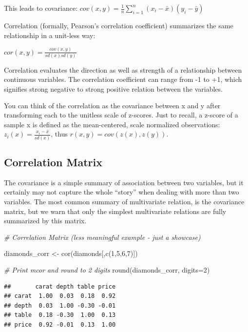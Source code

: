 \documentclass[
]{book}
\newenvironment{Shaded}{\begin{snugshade}}{\end{snugshade}}
\newcommand{\AttributeTok}[1]{\textcolor[rgb]{0.77,0.63,0.00}{#1}}
\newcommand{\CommentTok}[1]{\textcolor[rgb]{0.56,0.35,0.01}{\textit{#1}}}
\newcommand{\DecValTok}[1]{\textcolor[rgb]{0.00,0.00,0.81}{#1}}
\newcommand{\FunctionTok}[1]{\textcolor[rgb]{0.00,0.00,0.00}{#1}}
\newcommand{\NormalTok}[1]{#1}
\newcommand{\OtherTok}[1]{\textcolor[rgb]{0.56,0.35,0.01}{#1}}
\begin{document}
This leads to covariance:
\(cov(x,y) =\frac{1}{n}\sum_{i=1}^{n}(x_i - \bar{x})(y_i -\bar{y})\)

Correlation (formally, Pearson's correlation coefficient) summarizes the same relationship in a unit-less way:

\(cor(x,y)=\frac{cov(x,y)}{sd(x)sd(y)}\)

Correlation evaluates the direction as well as strength of a relationship between continuous variables. The correlation coefficient can range from -1 to +1, which signifies strong negative to strong positive relation between the variables.

You can think of the correlation as the covariance between x and y after transforming each to the unitless scale of z-scores. Just to recall, a z-score of a sample x is defined as the mean-centered, scale normalized observations: \(z_i(x)=\frac{x_i-\bar{x}}{sd(x)}\), thus \(r(x,y)=cov(z(x),z(y))\).

\hypertarget{correlation-matrix}{%
\subsection{Correlation Matrix}\label{correlation-matrix}}

The covariance is a simple summary of association between two variables, but it certainly may not capture the whole ``story'' when dealing with more than two variables. The most common summary of multivariate relation, is the covariance matrix, but we warn that only the simplest multivariate relations are fully summarized by this matrix.

\begin{Shaded}
\begin{Highlighting}[]
\CommentTok{\# Correlation Matrix (less meaningful example {-} just a showcase)}

\NormalTok{diamonds\_corr }\OtherTok{\textless{}{-}} \FunctionTok{cor}\NormalTok{(diamonds[,}\FunctionTok{c}\NormalTok{(}\DecValTok{1}\NormalTok{,}\DecValTok{5}\NormalTok{,}\DecValTok{6}\NormalTok{,}\DecValTok{7}\NormalTok{)])}

\CommentTok{\# Print mcor and round to 2 digits}
\FunctionTok{round}\NormalTok{(diamonds\_corr, }\AttributeTok{digits=}\DecValTok{2}\NormalTok{)}
\end{Highlighting}
\end{Shaded}

\begin{verbatim}
##       carat depth table price
## carat  1.00  0.03  0.18  0.92
## depth  0.03  1.00 -0.30 -0.01
## table  0.18 -0.30  1.00  0.13
## price  0.92 -0.01  0.13  1.00
\end{verbatim}
\end{document}

